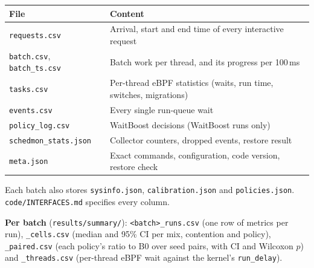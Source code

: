 \documentclass[10.5pt,a4paper]{article}
\newcommand{\f}[1]{\texttt{#1}}
\begin{document}
\begin{tabularx}{\textwidth}{@{}l L@{}}
\toprule
\textbf{File} & \textbf{Content} \\
\midrule
\f{requests.csv} & Arrival, start and end time of every interactive request \\
\f{batch.csv}, \f{batch\_ts.csv} & Batch work per thread, and its progress per 100\,ms \\
\f{tasks.csv} & Per-thread eBPF statistics (waits, run time, switches, migrations) \\
\f{events.csv} & Every single run-queue wait \\
\f{policy\_log.csv} & WaitBoost decisions (WaitBoost runs only) \\
\f{schedmon\_stats.json} & Collector counters, dropped events, restore result \\
\f{meta.json} & Exact commands, configuration, code version, restore check \\
\bottomrule
\end{tabularx}

Each batch also stores \f{sysinfo.json}, \f{calibration.json} and \f{policies.json}. \f{code/INTERFACES.md} specifies every column.

\textbf{Per batch} (\f{results/summary/}): \f{<batch>\_runs.csv} (one row of metrics per run), \f{\_cells.csv} (median and 95\% CI per mix, contention and policy), \f{\_paired.csv} (each policy's ratio to B0 over seed pairs, with CI and Wilcoxon $p$) and \f{\_threads.csv} (per-thread eBPF wait against the kernel's \f{run\_delay}).
\end{document}
